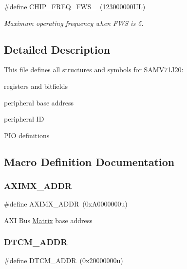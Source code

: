 \begin{DoxyCompactItemize}
\mbox{\label{group__SAMV71J20__definitions_ga3b66824f858591135877b369f98d48a5}} 
\#define \mbox{\hyperlink{group__SAMV71J20__definitions_ga3b66824f858591135877b369f98d48a5}{C\+H\+I\+P\+\_\+\+F\+R\+E\+Q\+\_\+\+F\+W\+S\+\_}}~(123000000\+U\+L)
\begin{DoxyCompactList}\small\item\em Maximum operating frequency when F\+WS is 5. \end{DoxyCompactList}\end{DoxyCompactItemize}


\subsection{Detailed Description}
This file defines all structures and symbols for S\+A\+M\+V71\+J20\+:
\begin{DoxyItemize}
\item registers and bitfields
\item peripheral base address
\item peripheral ID
\item P\+IO definitions 
\end{DoxyItemize}

\subsection{Macro Definition Documentation}
\mbox{\label{group__SAMV71J20__definitions_ga2fb7cc681bf5e7fbce5e3635b72a330a}} 
\subsubsection{\texorpdfstring{AXIMX\_ADDR}{AXIMX\_ADDR}}
{\footnotesize\ttfamily \#define A\+X\+I\+M\+X\+\_\+\+A\+D\+DR~(0x\+A0000000u)}

A\+XI Bus \mbox{\hyperlink{structMatrix}{Matrix}} base address \mbox{\label{group__SAMV71J20__definitions_ga26626a425f7ebb3a0c2dbc276f0d9f78}} 
\subsubsection{\texorpdfstring{DTCM\_ADDR}{DTCM\_ADDR}}
{\footnotesize\ttfamily \#define D\+T\+C\+M\+\_\+\+A\+D\+DR~(0x20000000u)}

